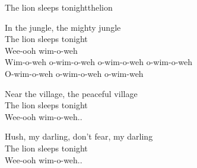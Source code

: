 \begin{song}{The lion sleeps tonight}{thelion}
\begin{vers}
\repopen In the jungle, the mighty jungle\\
The lion sleeps tonight \repclose\\
Wee-ooh wim-o-weh\\
\repopen Wim-o-weh o-wim-o-weh o-wim-o-weh o-wim-o-weh\\
O-wim-o-weh o-wim-o-weh o-wim-weh \repclose\\
\end{vers}
\begin{vers}
\repopen Near the village, the peaceful village\\
The lion sleeps tonight \repclose\\
Wee-ooh wim-o-weh..\\
\end{vers}
\begin{vers}
\repopen Hush, my darling, don't fear, my darling\\
The lion sleeps tonight \repclose\\
Wee-ooh wim-o-weh..\\
\end{vers}
\end{song}
